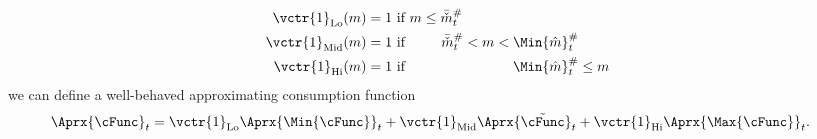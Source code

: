   \begin{equation*}\begin{gathered}\begin{aligned}
        \vctr{1}_{\text{Lo}}(\mNrm)  & = 1 \text{~if $          \mNrm \leq  \bar{\check{\mNrm}}_{\prd}^{\#} \phantom{< \mNrm <   \Min{\hat{\mNrm}}_{\prd}^{\#}          \leq \mNrm}$}
        \\  \vctr{1}_{\text{Mid}}(\mNrm)  & = 1 \text{~if $\phantom{ \mNrm \leq}~ \bar{\check{\mNrm}}_{\prd}^{\#}          < \mNrm <   \Min{\hat{\mNrm}}_{\prd}^{\#} \phantom{\leq \mNrm}$}
        \\  \vctr{1}_{\text{Hi}}(\mNrm)  & = 1 \text{~if $\phantom{ \mNrm \leq  ~\bar{\check{\mNrm}}_{\prd}^{\#}          < \mNrm < } \Min{\hat{\mNrm}}_{\prd}^{\#}           \leq \mNrm$}
      \end{aligned}\end{gathered}\end{equation*}
  we can define a well-behaved approximating consumption function
  \begin{equation}\begin{gathered}\begin{aligned}
        \Aprx{\cFunc}_{\prd}  & = \vctr{1}_{\text{Lo}} \Aprx{\Min{\cFunc}}_{\prd} + \vctr{1}_{\text{Mid}} \Aprx{\tilde{\cFunc}}_{\prd}+\vctr{1}_{\text{Hi}} \Aprx{\Max{\cFunc}}_{\prd}.
      \end{aligned}\end{gathered}\end{equation}

